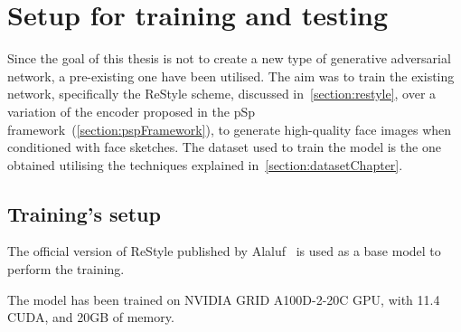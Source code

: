 \newpage
\section{Setup for training and testing} %
\label{sec:training and testing setup}
Since the goal of this thesis is not to create a new type of generative adversarial network, a pre-existing one have been utilised. The aim was to train the existing network, specifically the ReStyle scheme, discussed in~\ref{section:restyle}, over a variation of the encoder proposed in the pSp framework~(\ref{section:pspFramework}), to generate high-quality face images when conditioned with face sketches. 
The dataset used to train the model is the one obtained utilising the techniques explained in~\ref{section:datasetChapter}.
%
\subsection{Training's setup}
The official version of ReStyle published by Alaluf~\cite{alaluf2021restyle} is used as a base model to perform the training.

\noindent The model has been trained on NVIDIA GRID A100D-2-20C GPU, with 11.4 CUDA, and \num{20}GB of memory.

